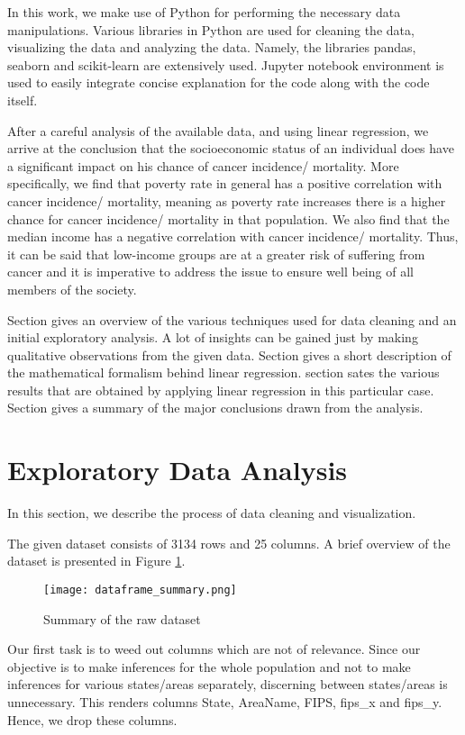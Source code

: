 \documentclass[conference]{IEEEtran}
\newcommand{\rom}[1]{\uppercase\expandafter{\romannumeral #1\relax}}
\begin{document}
In this work, we make use of Python for performing the necessary data manipulations. Various libraries in Python are used for cleaning the data, visualizing the data and analyzing the data. Namely, the libraries pandas, seaborn and scikit-learn are extensively used. Jupyter notebook environment is used to easily integrate concise explanation for the code along with the code itself.

After a careful analysis of the available data, and using linear regression, we arrive at the conclusion that the socioeconomic status of an individual does have a significant impact on his chance of cancer incidence/ mortality. More specifically, we find that poverty rate in general has a positive correlation with cancer incidence/ mortality, meaning as poverty rate increases there is a higher chance for cancer incidence/ mortality in that population. We also find that the median income has a negative correlation with cancer incidence/ mortality. Thus, it can be said that low-income groups are at a greater risk of suffering from cancer and it is imperative to address the issue to ensure well being of all members of the society.

Section \rom{2} gives an overview of the various techniques used for data cleaning and an initial exploratory analysis. A lot of insights can be gained just by making qualitative observations from the given data. Section \rom{3} gives a short description of the mathematical formalism behind linear regression. section \rom{4} sates the various results that are obtained by applying linear regression in this particular case. Section \rom{5} gives a summary of the major conclusions drawn from the analysis.

\section{Exploratory Data Analysis}

In this section, we describe the process of data cleaning and visualization.

The given dataset consists of 3134 rows and 25 columns. A brief overview of the dataset is presented in Figure \ref{df_sum}.

\begin{figure}[tbh]
\centering
\texttt{[image: dataframe\_summary.png]}
\caption{Summary of the raw dataset}
\label{df_sum}
\end{figure}

Our first task is to weed out columns which are not of relevance. Since our objective is to make inferences for the whole population and not to make inferences for various states/areas separately, discerning between states/areas is unnecessary. This renders columns State, AreaName, FIPS, fips\_x and fips\_y. Hence, we drop these columns.
\end{document}
